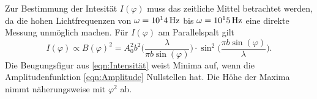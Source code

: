 Zur Bestimmung der Intesität $I(\varphi)$ muss das zeitliche Mittel betrachtet
werden, da die hohen Lichtfrequenzen von $\omega = 10^14\,\si{\hertz}$ bis $\omega = 10^15\,\si{\hertz}$
eine direkte Messung unmöglich machen. Für $I(\varphi)$ am Parallelspalt gilt
\begin{equation}
  I(\varphi) \propto B(\varphi)^2 = A_0^2b^2 \bigg(\frac{\lambda}{\pi b \sin{(\varphi)}}\bigg)
  \cdot \sin^2{\bigg(\frac{\pi b \sin{(\varphi)}}{\lambda}\bigg)}.
  \label{eqn:Intensität}
\end{equation}
Die Beugungsfigur aus \eqref{eqn:Intensität} weist Minima auf, wenn die
Amplitudenfunktion \eqref{eqn:Amplitude} Nullstellen hat. Die Höhe der Maxima
nimmt näherungsweise mit $\varphi^2$ ab. 
